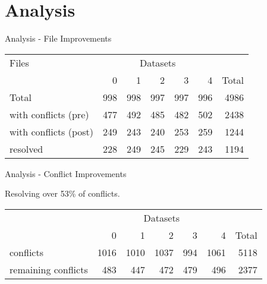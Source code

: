 \documentclass{beamer}
\begin{document}
\section{Analysis}

\begin{frame}{Analysis - File Improvements}

\begin{table}[ht]
\begin{center}

\begin{tabular}[h]{l||r|r|r|r|r||r}
Files &  \multicolumn{5}{c}{Datasets} \\
        & 0 & 1 & 2 & 3 & 4 & Total \\
\hline
Total & 998 & 998 & 997 & 997 & 996 & 4986\\ 
\hline
with conflicts (pre) & 477 &	492 & 485 & 482	& 502 &	2438\\ 
with conflicts (post) & 249	& 243 &	240 & 253 &	259 & 1244\\
\hline
resolved & 228 & 249 & 245 & 229 & 243 & 1194

\end{tabular}
\end{center}
\label{tab:files}
\end{table}

  \note{

  }

\end{frame}

\begin{frame}{Analysis - Conflict Improvements}

Resolving over 53\% of conflicts.

\begin{table}[ht]
\begin{center}
\begin{tabular}[h]{l||r|r|r|r|r||r}
 &  \multicolumn{5}{c}{Datasets} \\
        & 0 & 1 & 2 & 3 & 4 & Total \\
\hline
conflicts & 1016 & 1010	& 1037 & 994 &1061 & 5118 \\
\hline
remaining conflicts & 483 &	447	& 472 &	479	& 496 &	2377

\end{tabular}
\end{center}
\label{tab:conflicts}
\end{table}

  \note{

  }

\end{frame}
\end{document}

